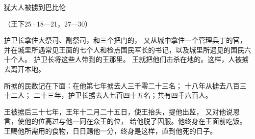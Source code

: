 {\par }{\SH 犹大人被掳到巴比伦
\par }{\R （王下25·18—21，27—30）
\par }{\PP {}护卫长拿住大祭司{}、副祭司{}，和三个把门的，
又从城中拿住一个管理兵丁的官，并在城里所遇常见王面的七个人和检点国民军长的书记，以及城里所遇见的国民六十个人。
护卫长{}将这些人带到{}的{}王那里。
王就把他们击杀在{}地的{}。这样，{}人被掳去离开本地。
\par }{\PP {}所掳的民数记在下面：在他第七年掳去{}人三千零二十三名；
十八年从{}掳去八百三十二人；
二十三年，护卫长{}掳去{}人七百四十五名；共有四千六百人。
\par }{\PP {}王{}被掳后三十七年，{}王{}{}年十二月二十五日，使{}王{}抬头，提他出监，
又对他说恩言，使他的位高过与他一同在{}众王的位，
给他脱了囚服。他终身在{}王面前吃饭。
王赐他所需用的食物，日日赐他一分，终身是这样，直到他死的日子。
\par }